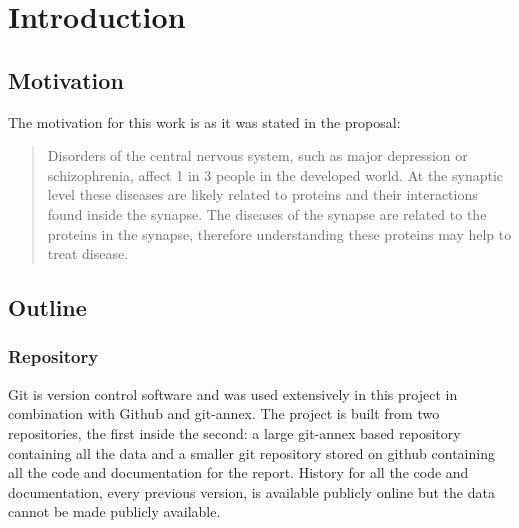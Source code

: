 \chapter{Introduction}
\label{introduction}

\lipsum[1]

\section{Motivation}

The motivation for this work is as it was stated in the proposal\cite{proposal}:

\begin{quote}
    Disorders of the central nervous system, such as major depression or schizophrenia, affect 1 in 3 people in the developed world.
    At the synaptic level these diseases are likely related to proteins and their interactions found inside the synapse\cites{chua_architecture_2010,synsys}.
    The diseases of the synapse are related to the proteins in the synapse\cite{chua_architecture_2010}, therefore understanding these proteins may help to treat disease\cite{li_interaction_2010}.
\end{quote}


\section{Outline}

\lipsum[2-5]

\subsection{Repository}

Git is version control software and was used extensively in this project in combination with Github\cite{github} and git-annex\cite{gitannex}.
The project is built from two repositories, the first inside the second: a large git-annex based repository containing all the data and a smaller git repository stored on github containing all the code and documentation for the report\cite{opencast-bio}.
History for all the code and documentation, every previous version, is available publicly online but the data cannot be made publicly available.

